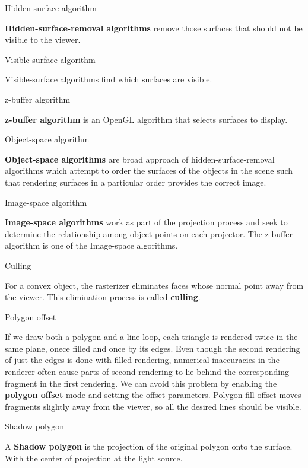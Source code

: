 \documentclass[10pt,a4paper]{article}
\begin{document}
\begin{enumerate}
		{\large \item Hidden-surface algorithm}
				
			\textbf{Hidden-surface-removal algorithms }remove those surfaces that should not be visible to the viewer.\\
			
		{\large \item Visible-surface algorithm}
				
			Visible-surface algorithms find which surfaces are visible.\\
			
		{\large \item z-buffer algorithm}
			
			\textbf{z-buffer algorithm} is an OpenGL algorithm that selects surfaces to display.\\	
		
		{\large \item Object-space algorithm}
	
			\textbf{Object-space algorithms} are broad approach of hidden-surface-removal algorithms which attempt to order the surfaces of the objects in the scene such that rendering surfaces in a particular order provides the correct image.\\
			
		
		{\large \item Image-space algorithm}
		
			\textbf{Image-space algorithms} work as part of the projection process and seek to determine the relationship among object points on each projector. The z-buffer algorithm is one of the Image-space algorithms.\\
			
		{\large \item Culling}
			
			For a convex object, the rasterizer eliminates faces whose normal point away from the viewer. This elimination process is called \textbf{culling}.\\	
			
		{\large \item Polygon offset}
			
			If we draw both a polygon and a line loop, each triangle is rendered twice in the same plane, onece filled and once by its edges. Even though the second rendering of just the edges is done with filled rendering, numerical inaccuracies in the renderer often cause parts of second rendering to lie behind the corresponding fragment in the first rendering. We can avoid this problem by enabling the \textbf{polygon offset} mode and setting the offset parameters. Polygon fill offset moves fragments slightly away from the viewer, so all the desired lines should be visible.\\
			
			
		{\large \item Shadow polygon}
			
			A \textbf{Shadow polygon} is the projection of the original polygon onto the surface. With the center of projection at the light source.\\
	\end{enumerate}
\end{document}
